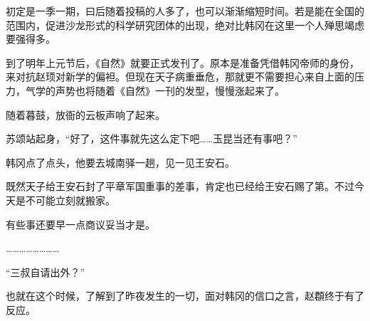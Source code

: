 初定是一季一期，曰后随着投稿的人多了，也可以渐渐缩短时间。若是能在全国的范围内，促进沙龙形式的科学研究团体的出现，绝对比韩冈在这里一个人殚思竭虑要强得多。

到了明年上元节后，《自然》就要正式发刊了。原本是准备凭借韩冈帝师的身份，来对抗赵顼对新学的偏袒。但现在天子病重垂危，那就更不需要担心来自上面的压力，气学的声势也将随着《自然》一刊的发型，慢慢涨起来了。

随着暮鼓，放衙的云板声响了起来。

苏颂站起身，“好了，这件事就先这么定下吧……玉昆当还有事吧？”

韩冈点了点头，他要去城南驿一趟，见一见王安石。

既然天子给王安石封了平章军国重事的差事，肯定也已经给王安石赐了第。不过今天是不可能立刻就搬家。

有些事还要早一点商议妥当才是。

……………………

“三叔自请出外？”

也就在这个时候，了解到了昨夜发生的一切，面对韩冈的信口之言，赵頵终于有了反应。

